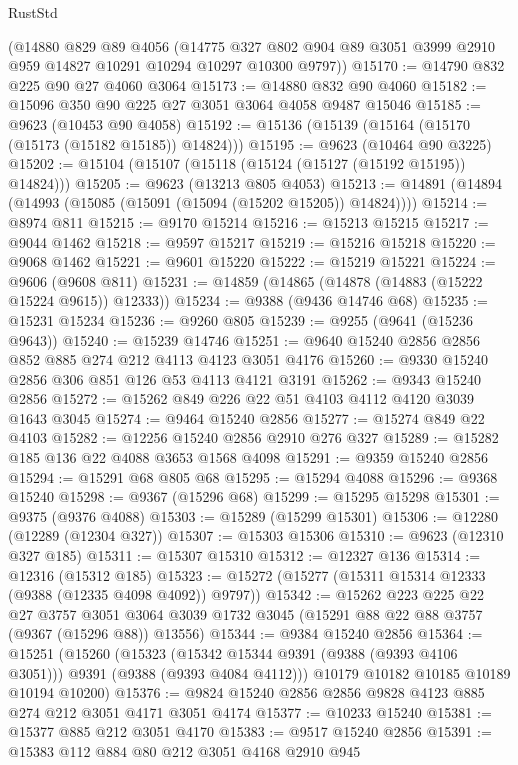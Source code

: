 \begin{lexlean}{RustStd}
\begin{coremodule}
    (@14880
      @829
      @89
      @4056
      (@14775 @327 @802 @904 @89 @3051 @3999 @2910 @959 @14827 @10291 @10294 @10297 @10300 @9797))
@15170 := @14790 @832 @225 @90 @27 @4060 @3064
@15173 := @14880 @832 @90 @4060
@15182 := @15096 @350 @90 @225 @27 @3051 @3064 @4058 @9487 @15046
@15185 := @9623 (@10453 @90 @4058)
@15192 := @15136 (@15139 (@15164 (@15170 (@15173 (@15182 @15185)) @14824)))
@15195 := @9623 (@10464 @90 @3225)
@15202 := @15104 (@15107 (@15118 (@15124 (@15127 (@15192 @15195)) @14824)))
@15205 := @9623 (@13213 @805 @4053)
@15213 := @14891 (@14894 (@14993 (@15085 (@15091 (@15094 (@15202 @15205)) @14824))))
@15214 := @8974 @811
@15215 := @9170 @15214
@15216 := @15213 @15215
@15217 := @9044 @1462
@15218 := @9597 @15217
@15219 := @15216 @15218
@15220 := @9068 @1462
@15221 := @9601 @15220
@15222 := @15219 @15221
@15224 := @9606 (@9608 @811)
@15231 := @14859 (@14865 (@14878 (@14883 (@15222 @15224 @9615)) @12333))
@15234 := @9388 (@9436 @14746 @68)
@15235 := @15231 @15234
@15236 := @9260 @805
@15239 := @9255 (@9641 (@15236 @9643))
@15240 := @15239 @14746
@15251 := @9640 @15240 @2856 @2856 @852 @885 @274 @212 @4113 @4123 @3051 @4176
@15260 := @9330 @15240 @2856 @306 @851 @126 @53 @4113 @4121 @3191
@15262 := @9343 @15240 @2856
@15272 := @15262 @849 @226 @22 @51 @4103 @4112 @4120 @3039 @1643 @3045
@15274 := @9464 @15240 @2856
@15277 := @15274 @849 @22 @4103
@15282 := @12256 @15240 @2856 @2910 @276 @327
@15289 := @15282 @185 @136 @22 @4088 @3653 @1568 @4098
@15291 := @9359 @15240 @2856
@15294 := @15291 @68 @805 @68
@15295 := @15294 @4088
@15296 := @9368 @15240
@15298 := @9367 (@15296 @68)
@15299 := @15295 @15298
@15301 := @9375 (@9376 @4088)
@15303 := @15289 (@15299 @15301)
@15306 := @12280 (@12289 (@12304 @327))
@15307 := @15303 @15306
@15310 := @9623 (@12310 @327 @185)
@15311 := @15307 @15310
@15312 := @12327 @136
@15314 := @12316 (@15312 @185)
@15323 := @15272 (@15277 (@15311 @15314 @12333 (@9388 (@12335 @4098 @4092)) @9797))
@15342 := @15262
    @223
    @225
    @22
    @27
    @3757
    @3051
    @3064
    @3039
    @1732
    @3045
    (@15291 @88 @22 @88 @3757 (@9367 (@15296 @88)) @13556)
@15344 := @9384 @15240 @2856
@15364 := @15251
    (@15260
      (@15323 (@15342 @15344 @9391 (@9388 (@9393 @4106 @3051))) @9391 (@9388 (@9393 @4084 @4112)))
      @10179
      @10182
      @10185
      @10189
      @10194
      @10200)
@15376 := @9824 @15240 @2856 @2856 @9828 @4123 @885 @274 @212 @3051 @4171 @3051 @4174
@15377 := @10233 @15240
@15381 := @15377 @885 @212 @3051 @4170
@15383 := @9517 @15240 @2856
@15391 := @15383 @112 @884 @80 @212 @3051 @4168 @2910 @945

\end{coremodule}
\end{lexlean}
